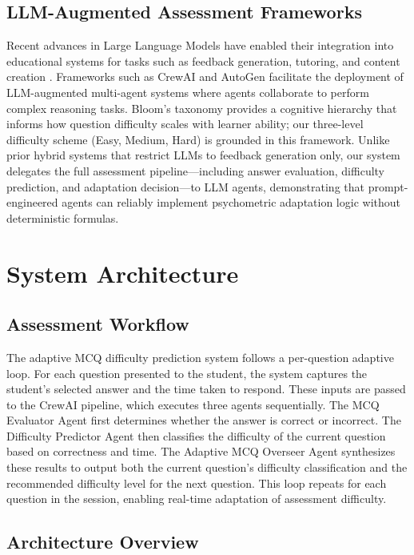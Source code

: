 \documentclass[conference]{IEEEtran}
\begin{document}
\subsection{LLM-Augmented Assessment Frameworks}
Recent advances in Large Language Models have enabled their integration into educational systems for tasks such as feedback generation, tutoring, and content creation \cite{chen2023}. Frameworks such as CrewAI \cite{liang2023} and AutoGen facilitate the deployment of LLM-augmented multi-agent systems where agents collaborate to perform complex reasoning tasks. Bloom's taxonomy \cite{bloom1956} provides a cognitive hierarchy that informs how question difficulty scales with learner ability; our three-level difficulty scheme (Easy, Medium, Hard) is grounded in this framework. Unlike prior hybrid systems that restrict LLMs to feedback generation only, our system delegates the full assessment pipeline---including answer evaluation, difficulty prediction, and adaptation decision---to LLM agents, demonstrating that prompt-engineered agents can reliably implement psychometric adaptation logic without deterministic formulas.

\section{System Architecture}

\subsection{Assessment Workflow}
The adaptive MCQ difficulty prediction system follows a per-question adaptive loop. For each question presented to the student, the system captures the student's selected answer and the time taken to respond. These inputs are passed to the CrewAI pipeline, which executes three agents sequentially. The MCQ Evaluator Agent first determines whether the answer is correct or incorrect. The Difficulty Predictor Agent then classifies the difficulty of the current question based on correctness and time. The Adaptive MCQ Overseer Agent synthesizes these results to output both the current question's difficulty classification and the recommended difficulty level for the next question. This loop repeats for each question in the session, enabling real-time adaptation of assessment difficulty.

\subsection{Architecture Overview}
\end{document}
